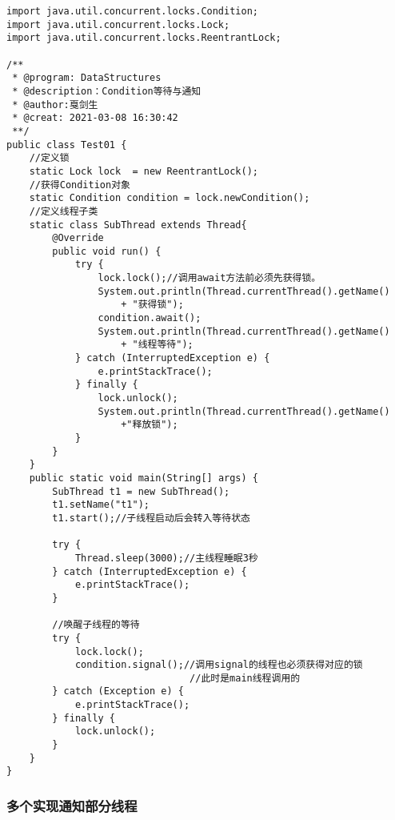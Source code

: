 \documentclass[a4paper]{report}
\begin{document}
\begin{Verbatim}[frame=single,numbersep=5pt,xleftmargin=1.5em,xrightmargin=1.5em]
import java.util.concurrent.locks.Condition;
import java.util.concurrent.locks.Lock;
import java.util.concurrent.locks.ReentrantLock;

/**
 * @program: DataStructures
 * @description：Condition等待与通知
 * @author:戛剑生
 * @creat: 2021-03-08 16:30:42
 **/
public class Test01 {
    //定义锁
    static Lock lock  = new ReentrantLock();
    //获得Condition对象
    static Condition condition = lock.newCondition();
    //定义线程子类
    static class SubThread extends Thread{
        @Override
        public void run() {
            try {
                lock.lock();//调用await方法前必须先获得锁。
                System.out.println(Thread.currentThread().getName()
                    + "获得锁");
                condition.await();
                System.out.println(Thread.currentThread().getName()
                    + "线程等待");
            } catch (InterruptedException e) {
                e.printStackTrace();
            } finally {
                lock.unlock();
                System.out.println(Thread.currentThread().getName()
                    +"释放锁");
            }
        }
    }
    public static void main(String[] args) {
        SubThread t1 = new SubThread();
        t1.setName("t1");
        t1.start();//子线程启动后会转入等待状态

        try {
            Thread.sleep(3000);//主线程睡眠3秒
        } catch (InterruptedException e) {
            e.printStackTrace();
        }

        //唤醒子线程的等待
        try {
            lock.lock();
            condition.signal();//调用signal的线程也必须获得对应的锁
                                //此时是main线程调用的
        } catch (Exception e) {
            e.printStackTrace();
        } finally {
            lock.unlock();
        }
    }
}\end{Verbatim}
\subsubsection{多个实现通知部分线程}
\end{document}
